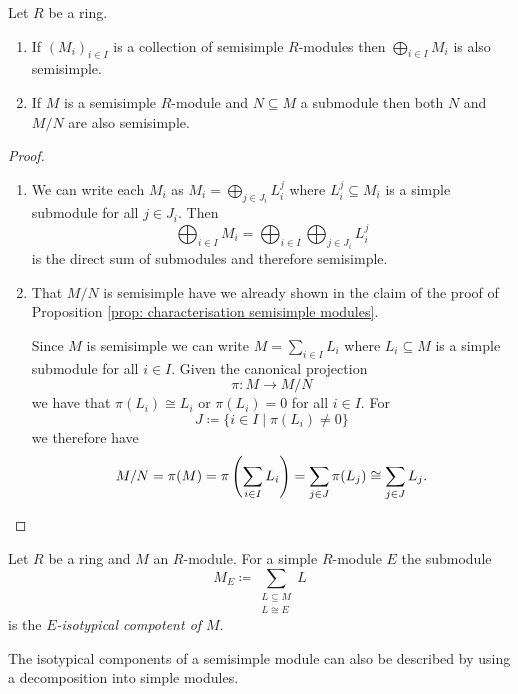 \begin{lem}\label{lem: inherit semisimple}
  Let $R$ be a ring.
  \begin{enumerate}[label=\emph{\alph*)},leftmargin=*]
    \item
      If $(M_i)_{i \in I}$ is a collection of semisimple $R$-modules then $\bigoplus_{i \in I} M_i$ is also semisimple.
    \item
      If $M$ is a semisimple $R$-module and $N \subseteq M$ a submodule then both $N$ and $M/N$ are also semisimple.
  \end{enumerate}
\end{lem}
\begin{proof}
  \begin{enumerate}[label=\emph{\alph*)},leftmargin=*]
    \item
      We can write each $M_i$ as $M_i = \bigoplus_{j \in J_i} L^j_i$ where $L^j_i \subseteq M_i$ is a simple submodule for all $j \in J_i$. Then
      \[
        \bigoplus_{i \in I} M_i = \bigoplus_{i \in I} \bigoplus_{j \in J_i} L^j_i
      \]
      is the direct sum of submodules and therefore semisimple.
    \item
      That $M/N$ is semisimple have we already shown in the claim of the proof of Proposition \ref{prop: characterisation semisimple modules}.
      
      Since $M$ is semisimple we can write $M = \sum_{i \in I} L_i$ where $L_i \subseteq M$ is a simple submodule for all $i \in I$. Given the canonical projection
      \[
        \pi \colon M \to M/N
      \]
      we have that $\pi(L_i) \cong L_i$ or $\pi(L_i) = 0$ for all $i \in I$. For
      \[
        J \coloneqq \{i \in I \mid \pi(L_i) \neq 0\}
      \]
      we therefore have
      \[
        M/N = \pi(M) = \pi\left( \sum_{i \in I} L_i \right) = \sum_{j \in J} \pi(L_j) \cong \sum_{j \in J} L_j.
        \qedhere
      \]
  \end{enumerate}
\end{proof}


\begin{defi}
  Let $R$ be a ring and $M$ an $R$-module. For a simple $R$-module $E$ the submodule
  \[
    M_E \coloneqq \sum_{\substack{L \subseteq M \\ L \cong E}} L
  \]
  is the \emph{$E$-isotypical compotent of $M$}.
\end{defi}


The isotypical components of a semisimple module can also be described by using a decomposition into simple modules.


